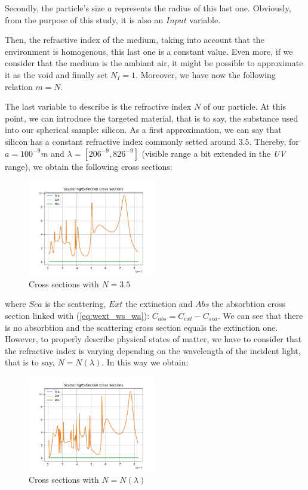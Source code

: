 \documentclass{article}
\numberwithin{equation}{section}
\begin{document}
Secondly, the particle's size $a$ represents the radius of this last one. Obviously, from the purpose of this study, it is also an $Input$ variable.

Then, the refractive index of the medium, taking into account that the environment is homogenous, this last one is a constant value. Even more, if we consider that the medium is the ambiant air, it might be possible to approximate it as the void and finally set $N_{I}=1$. Moreover, we have now the following relation $m=N$.

The last variable to describe is the refractive index $N$ of our particle. At this point, we can introduce the targeted material, that is to say, the substance used into our spherical sample: silicon. As a first approximation, we can say that silicon has a constant refractive index commonly setted around $3.5$. Thereby, for $a=100^{-9}m$ and $\lambda=[206^{-9}, 826^{-9}]$ (visible range a bit extended in the \textit{UV} range), we obtain the following cross sections:
\begin{figure}[h]
    \centering
    \includegraphics[width=0.5\textwidth, height=0.4\textwidth]{ri_const.png}
    \caption{Cross sections with $N=3.5$}
\end{figure}
where $Sca$ is the scattering, $Ext$ the extinction and $Abs$ the absorbtion cross section linked with (\ref{eq:wext_ws_wa}): $C_{abs} = C_{ext} - C_{sca}$. We can see that there is no absorbtion and the scattering cross section equals the extinction one. However, to properly describe physical states of matter, we have to consider that the refractive index is varying depending on the wavelength of the incident light, that is to say, $N=N(\lambda)$. In this way we obtain:
\begin{figure}[h]
    \centering
    \includegraphics[width=0.5\textwidth, height=0.4\textwidth]{ri_var_real.png}
    \caption{Cross sections with $N=N(\lambda)$}
\end{figure}
\end{document}
